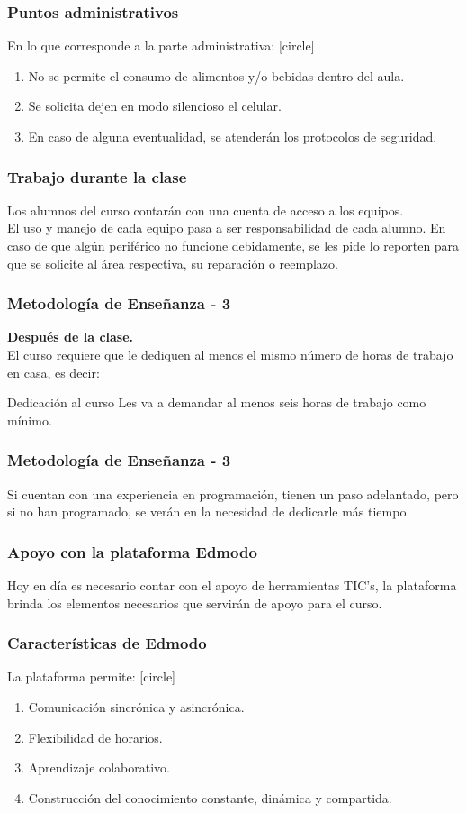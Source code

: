 \begin{frame}
\frametitle{Puntos administrativos}
En lo que corresponde a la parte administrativa:
[circle]
\begin{enumerate}[<+->]
\item No se permite el consumo de alimentos y/o bebidas dentro del aula.
\item Se solicita dejen en modo silencioso el celular.
\item En caso de alguna eventualidad, se atenderán los protocolos de seguridad.
\end{enumerate}
\end{frame}
\begin{frame}
\frametitle{Trabajo durante la clase}
Los alumnos del curso contarán con una cuenta de acceso a los equipos.
\\
\bigskip
\pause
El uso y manejo de cada equipo pasa a ser responsabilidad de cada alumno. En caso de que algún periférico no funcione debidamente, se les pide lo reporten para que se solicite al área respectiva, su reparación o reemplazo.
\end{frame}
\begin{frame}
\frametitle{Metodología de Enseñanza - 3}
\textbf{Después de la clase.}
\\
\medskip
El curso \alert{requiere que le dediquen al menos el mismo número de horas de trabajo en casa}, es decir:
\pause
\begin{exampleblock}{Dedicación al curso}
Les va a demandar al menos seis horas de trabajo como mínimo.
\end{exampleblock}
\end{frame}
\begin{frame}
\frametitle{Metodología de Enseñanza - 3}
Si cuentan con una experiencia en programación, tienen un paso adelantado, pero si no han programado, se verán en la necesidad de dedicarle más tiempo.
\end{frame}
\begin{frame}
\frametitle{Apoyo con la plataforma Edmodo}
Hoy en día es necesario contar con el apoyo de herramientas TIC's, la plataforma  brinda los elementos necesarios que servirán de apoyo para el curso.
\end{frame}
\begin{frame}
\frametitle{Características de Edmodo}
La plataforma permite:
[circle]
\begin{enumerate}[<+->]
\item Comunicación sincrónica y asincrónica.
\item Flexibilidad de horarios.
\item Aprendizaje colaborativo.
\item Construcción del conocimiento constante, dinámica y compartida.
\end{enumerate}
\end{frame}
